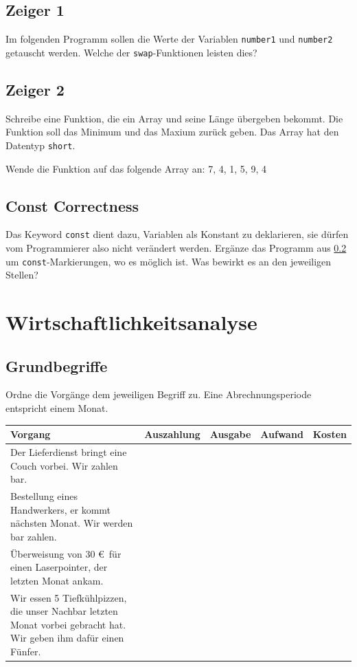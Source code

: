 \documentclass[11pt, a4paper]{article}
\begin{document}
\subsection{Zeiger 1}
Im folgenden Programm sollen die Werte der Variablen \texttt{number1} und \texttt{number2} getauscht werden. Welche der \texttt{swap}-Funktionen leisten dies?


\subsection{Zeiger 2}
\label{zeigerAufgabe}
Schreibe eine Funktion, die ein Array und seine Länge übergeben bekommt. Die Funktion soll das Minimum und das Maxium zurück geben. Das Array hat den Datentyp \texttt{short}.

Wende die Funktion auf das folgende Array an:
7, 4, 1, 5, 9, 4

\subsection{Const Correctness}
Das Keyword \texttt{const} dient dazu, Variablen als Konstant zu deklarieren, sie dürfen vom Programmierer also nicht verändert werden. Ergänze das Programm aus \ref{zeigerAufgabe} um \texttt{const}-Markierungen, wo es möglich ist. Was bewirkt es an den jeweiligen Stellen?

\newpage
\section{Wirtschaftlichkeitsanalyse}
\subsection{Grundbegriffe}
Ordne die Vorgänge dem jeweiligen Begriff zu. Eine Abrechnungsperiode entspricht einem Monat.

\begin{tabularx}{\columnwidth}{X|c|c|c|c}
	Vorgang & Auszahlung & Ausgabe & Aufwand & Kosten \\ \hline
	Der Lieferdienst bringt eine Couch vorbei. Wir zahlen bar. &   &   &  &  \\ \hline
	Bestellung eines Handwerkers, er kommt nächsten Monat. Wir werden bar zahlen. &  &  &  &  \\ \hline
	Überweisung von 30 \euro \ für einen Laserpointer, der letzten Monat ankam. &   &  &  & \\ \hline
	Wir essen 5 Tiefkühlpizzen, die unser Nachbar letzten Monat vorbei gebracht hat. Wir geben ihm dafür einen Fünfer. &   &  &   &  
\end{tabularx}
\end{document}
